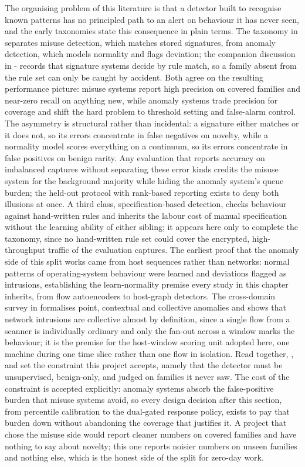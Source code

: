 The organising problem of this literature is that a detector built to recognise known patterns has no principled path to an alert on behaviour it has never seen, and the early taxonomies state this consequence in plain terms. The taxonomy in \cite{k1} separates misuse detection, which matches stored signatures, from anomaly detection, which models normality and flags deviation; the companion discussion in \cite{k2}-\cite{k3} records that signature systems decide by rule match, so a family absent from the rule set can only be caught by accident. Both agree on the resulting performance picture: misuse systems report high precision on covered families and near-zero recall on anything new, while anomaly systems trade precision for coverage and shift the hard problem to threshold setting and false-alarm control. The asymmetry is structural rather than incidental: a signature either matches or it does not, so its errors concentrate in false negatives on novelty, while a normality model scores everything on a continuum, so its errors concentrate in false positives on benign rarity. Any evaluation that reports accuracy on imbalanced captures without separating these error kinds credits the misuse system for the background majority while hiding the anomaly system's queue burden; the held-out protocol with rank-based reporting exists to deny both illusions at once. A third class, specification-based detection, checks behaviour against hand-written rules and inherits the labour cost of manual specification without the learning ability of either sibling; it appears here only to complete the taxonomy, since no hand-written rule set could cover the encrypted, high-throughput traffic of the evaluation captures. The earliest proof that the anomaly side of this split works came from host sequences rather than networks: normal patterns of operating-system behaviour were learned and deviations flagged as intrusions, establishing the learn-normality premise every study in this chapter inherits, from flow autoencoders to host-graph detectors. The cross-domain survey in \cite{k3} formalises point, contextual and collective anomalies and shows that network intrusions are collective almost by definition, since a single flow from a scanner is individually ordinary and only the fan-out across a window marks the behaviour; it is the premise for the host-window scoring unit adopted here, one machine during one time slice rather than one flow in isolation. Read together, \cite{k2}, \cite{k1} and \cite{k3} set the constraint this project accepts, namely that the detector must be unsupervised, benign-only, and judged on families it never saw. The cost of the constraint is accepted explicitly: anomaly systems absorb the false-positive burden that misuse systems avoid, so every design decision after this section, from percentile calibration to the dual-gated response policy, exists to pay that burden down without abandoning the coverage that justifies it. A project that chose the misuse side would report cleaner numbers on covered families and have nothing to say about novelty; this one reports noisier numbers on unseen families and nothing else, which is the honest side of the split for zero-day work.


